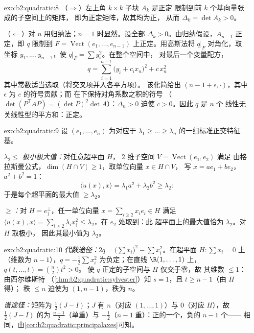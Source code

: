 \begin{solution}{exo:b2:quadratic:8}
（$\Rightarrow$）左上角 $k \times k$ 子块 $A_k$ 是正定
限制到前 $k$ 个基向量张成的子空间上的矩阵，
即为正定矩阵，故其均为正，
从而 $\Delta_k = \det A_k > 0$。

（$\Leftarrow$）对 $n$ 用归纳法；$n = 1$ 时显然。设全部
$\Delta_k > 0$。由归纳假设，$A_{n-1}$ 正定，即
 $q$ 限制到 $F = \operatorname{Vect}(e_1, \dots,
e_{n-1})$ 上正定。用高斯法将 $q|_F$ 对角化，取
坐标 $y_1, \dots, y_{n-1}$，使 $q|_F = \sum y_i^2$。在整个空间中，
对最后一个变量配方，
\[
q = \sum_{i=1}^{n-1} \bigl(y_i + c_i x_n\bigr)^2 + c\,x_n^2
\]
其中常数适当选取（将交叉项并入各平方项）。
该化简给出 $(n-1 + \epsilon, \cdot)$，其中
$\epsilon$ 为 $c$ 的符号贡献；而
在下保持对角系数之积的符号
（$\det(P^{\mathsf T}AP) = (\det P)^2\det A$）：$\Delta_n
> 0$ 迫使 $c > 0$。因此 $q$ 是 $n$ 个
线性无关线性型的平方和：正定。
\end{solution}

\begin{solution}{exo:b2:quadratic:9}
设 $(e_1, \dots, e_n)$ 为对应于 $\lambda_1
\geq \dots \geq \lambda_n$ 的一组标准正交特征基。

\emph{$\lambda_2 \leq$ 极小极大值：}对任意超平面 $H$，
$2$ 维子空间 $V = \operatorname{Vect}(e_1, e_2)$ 满足
由格拉斯曼公式，$\dim(H \cap V) \geq 1$，取单位向量 $x \in H \cap V$，
写 $x = ae_1 + be_2$，$a^2 + b^2 = 1$：
\[
\langle u(x), x\rangle = \lambda_1 a^2 + \lambda_2 b^2 \geq
\lambda_2 :
\]
于是每个超平面的最大值 $\geq \lambda_2$。

\emph{$\geq$：}对 $H = e_1^{\perp}$，任一单位向量 $x = \sum_{i\geq2}
x_ie_i \in H$ 满足 $\langle u(x), x\rangle = \sum_{i \geq 2}
\lambda_i x_i^2 \leq \lambda_2$，在 $e_2$ 处取到：此
超平面上的最大值恰为 $\lambda_2$。对 $H$ 取极小，
因此其最小值为 $\lambda_2$。
\end{solution}

\begin{solution}{exo:b2:quadratic:10}
\emph{代数途径：}$2q = \bigl(\sum x_i\bigr)^2 - \sum
x_i^2$。在超平面 $H : \sum x_i = 0$ 上（维数为 $n -
1$），$q = -\frac12\sum x_i^2$ 为负定；在直线
$\R(1, \dots, 1)$ 上，$q(t, \dots, t) = \binom n2 t^2 > 0$。
使 $q$ 正定的子空间与 $H$ 仅交于零，故
其维数 $\leq 1$：由西尔维斯特
（\cref{thm:b2:quadratic:sylvester}）知 $s = 1$，且 $t \geq n-1$（由 $H$ 得）；
秩 $\leq n$ 迫使为 $(1, n-1)$，秩为 $n$。

\emph{谱途径：}矩阵为 $\frac12(J - I)$；$J$ 有
 $n$（对应 $(1,\dots,1)$）与 $0$（对应 $H$），故
$\frac12(J-I)$ 的为 $\frac{n-1}{2}$（单重）与
$-\frac12$（$n-1$ 重）：正的一个，负的 $n-1$ 个——
相同，由\cref{cor:b2:quadratic:principalaxes}可知。
\end{solution}

